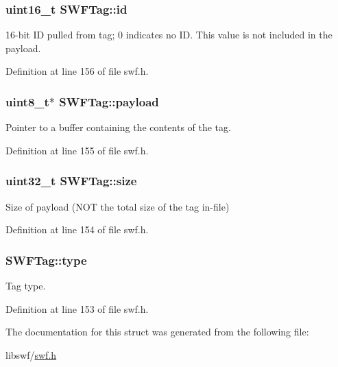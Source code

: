 \subsubsection[{id}]{\setlength{\rightskip}{0pt plus 5cm}uint16\+\_\+t S\+W\+F\+Tag\+::id}\label{struct_s_w_f_tag_a5ea4db43f2f7891bf5dadab7556a9a54}
16-\/bit I\+D pulled from tag; 0 indicates no I\+D. This value is not included in the payload. 

Definition at line 156 of file swf.\+h.

\hypertarget{struct_s_w_f_tag_a71d91ae229304ea8ee7ed56636d3aa18}{}
\subsubsection[{payload}]{\setlength{\rightskip}{0pt plus 5cm}uint8\+\_\+t$\ast$ S\+W\+F\+Tag\+::payload}\label{struct_s_w_f_tag_a71d91ae229304ea8ee7ed56636d3aa18}


Pointer to a buffer containing the contents of the tag. 



Definition at line 155 of file swf.\+h.

\hypertarget{struct_s_w_f_tag_a17e4a212bb86a411cec95574ec263815}{}
\subsubsection[{size}]{\setlength{\rightskip}{0pt plus 5cm}uint32\+\_\+t S\+W\+F\+Tag\+::size}\label{struct_s_w_f_tag_a17e4a212bb86a411cec95574ec263815}


Size of payload (N\+O\+T the total size of the tag in-\/file) 



Definition at line 154 of file swf.\+h.

\hypertarget{struct_s_w_f_tag_adb10fb48757369896fd9c41e47a59f44}{}
\subsubsection[{type}]{ S\+W\+F\+Tag\+::type}\label{struct_s_w_f_tag_adb10fb48757369896fd9c41e47a59f44}


Tag type. 



Definition at line 153 of file swf.\+h.



The documentation for this struct was generated from the following file\+:\begin{DoxyCompactItemize}
\item 
libswf/\hyperlink{swf_8h}{swf.\+h}\end{DoxyCompactItemize}
